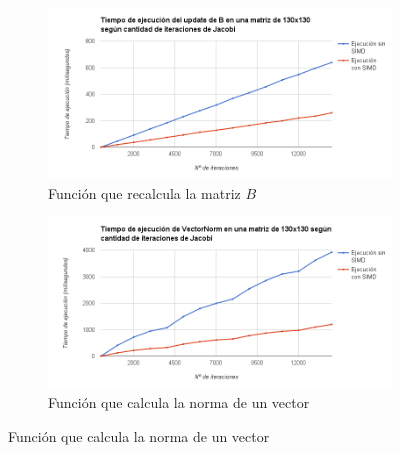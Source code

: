 \documentclass[a4paper]{article}
\begin{document}
\begin{figure}[!htbp]
\centering
\begin{subfigure}{.5\textwidth}
  \centering
	\includegraphics[width=\linewidth]{images/UpdateBIter.png}
  \caption{Función que recalcula la matriz $B$}
  \label{fig:UpdateBIter}
\end{subfigure}%
\begin{subfigure}{.5\textwidth}
  \centering
	\includegraphics[width=\linewidth]{images/NormVectorIter.png}
  \caption{Función que calcula la norma de un vector}
  \label{fig:NormVectorIter}
\end{subfigure}


\end{figure}
\end{document}
